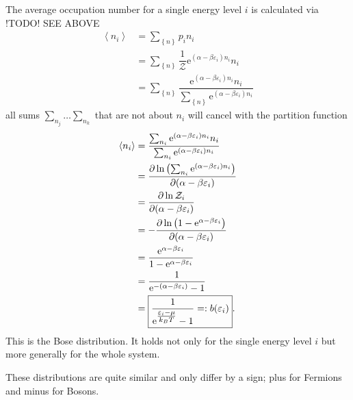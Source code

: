\documentclass[a4paper,10pt]{article}
\numberwithin{equation}{section}
\begin{document}
\begin{multicols}{2}
The average occupation number for a single energy level $i$ is calculated via !TODO! SEE ABOVE
\begin{align} 
  \left\langle n_i\right\rangle  &= \sum_{ \left\{n\right\}}^{}p_i n_i\\
                                 &= \sum_{ \left\{n\right\}}^{}\dfrac{1}{\mathcal{Z}}\text{e}^{(\alpha -\beta \varepsilon _i)n_i}n_i\\
                                 &= \sum_{ \left\{n\right\}}^{}\dfrac{\text{e}^{(\alpha -\beta \varepsilon _i)n_i}n_i}{\sum_{ \left\{n\right\}}^{}\text{e}^{(\alpha -\beta \varepsilon _i)n_i}}
\end{align} 
all sums $\sum_{n_j}^{}\hdots \sum_{n_k}^{}$ that are not about $n_i$ will cancel with the partition function
\begin{align} 
  \left\langle n_i\right\rangle  &= \dfrac{\sum_{n_i}^{}\text{e}^{(\alpha -\beta \varepsilon _i)n_i}n_i}{\sum_{n_i}^{}\text{e}^{(\alpha -\beta \varepsilon _i)n_i}}\\
                                 &= \diffp[]{\ln\left(\sum_{n_i}^{}\text{e}^{(\alpha -\beta \varepsilon _i)n_i}\right)}{(\alpha -\beta \varepsilon _i)}\\
                                 &= \diffp[]{\ln \mathcal{Z}_i}{(\alpha -\beta \varepsilon _i)}\\
                                 &= -\diffp[]{\ln \left(1-\text{e}^{\alpha -\beta \varepsilon _i}\right)}{(\alpha -\beta \varepsilon _i)}\\
                                 &= \dfrac{\text{e}^{\alpha -\beta \varepsilon _i}}{1-\text{e}^{\alpha -\beta \varepsilon _i}}\\
                                 &=\dfrac{1}{\text{e}^{-(\alpha -\beta \varepsilon _i)}-1}\\
                                 &=\boxed{\dfrac{1}{\text{e}^{\tfrac{\varepsilon _i-\mu }{k_BT}}-1}=:b(\varepsilon _i)}
.\end{align} 
This is the Bose distribution.
It holds not only for the single energy level $i$ but more generally for the whole system.

These distributions are quite similar and only differ by a sign; plus for Fermions and minus for Bosons.


\end{multicols}
\end{document}
